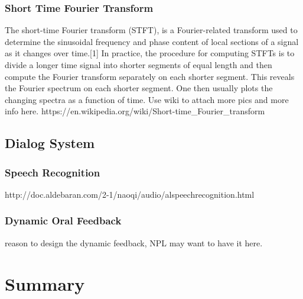 \subsubsection{Short Time Fourier Transform}
The short-time Fourier transform (STFT), is a Fourier-related transform used to determine the sinusoidal frequency and phase content of local sections of a signal as it changes over time.[1] In practice, the procedure for computing STFTs is to divide a longer time signal into shorter segments of equal length and then compute the Fourier transform separately on each shorter segment. This reveals the Fourier spectrum on each shorter segment. One then usually plots the changing spectra as a function of time.
Use wiki to attach more pics and more info here.
https://en.wikipedia.org/wiki/Short-time_Fourier_transform

\subsection{Dialog System}

\subsubsection{Speech Recognition}
http://doc.aldebaran.com/2-1/naoqi/audio/alspeechrecognition.html

\subsubsection{Dynamic Oral Feedback}
reason to design the dynamic feedback, NPL may want to have it here. 



\section{Summary}

